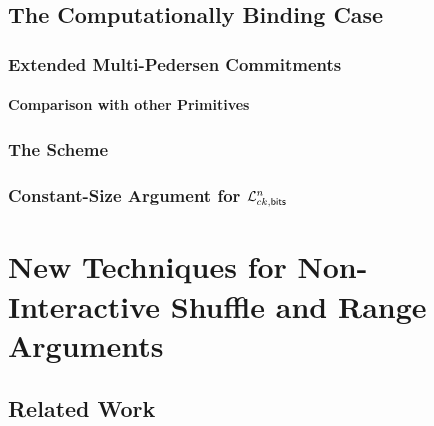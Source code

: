             

    \section{The Computationally Binding Case} \label{sec:bits-non-binding}

        

        \subsection{Extended Multi-Pedersen Commitments} \label{sec:ext-mp}

            

            \subsubsection{Comparison with other Primitives}

                

        \subsection{The Scheme} \label{sec:bits-scheme-nb}

            

        \subsection{Constant-Size Argument for $\mathcal{L}_{ck,\mathsf{bits}}^n$} \label{sec:matr-bits}

            


\chapter{New Techniques for Non-Interactive Shuffle and Range Arguments} \label{sec:shuf-rp}

    

    \section{Related Work} \label{sec:set-memb-rel-work}

        

